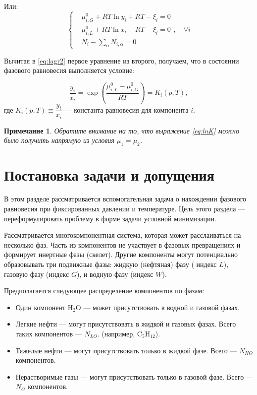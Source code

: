 \documentclass[12pt]{article}
\newtheorem{note}{Примечание}[section]
\begin{document}
Или:
\begin{equation}
\left\{
\begin{aligned}
& \mu_{i, G}^0 + RT \ln y_i + RT - \xi_i = 0\\
& \mu_{i, L}^0 + RT \ln x_i + RT - \xi_i = 0\\
& N_i - \sum_{\alpha} N_{i,\alpha} = 0
\end{aligned}
\label{eq:lagr2} \right.,\quad\forall i
\end{equation}

Вычитая в \eqref{eq:lagr2} первое уравнение из второго, получаем, что в состоянии фазового равновесия выполняется условие:

\begin{equation}
\frac{y_i}{x_i} = \exp \left(\frac{\mu_{i, L}^0 - \mu_{i, G}^0}{RT}\right) = K_i(p,T), \label{eq:lnK}
\end{equation}
где $K_i(p,T) \equiv \dfrac{y_i}{x_i}$ --- константа равновесия для компонента $i$.


\begin{note}
Обратите внимание на то, что выражение \eqref{eq:lnK} можно было получить напрямую из условия $\mu_1 = \mu_2$.
\end{note}


\section{Постановка задачи и допущения}

В этом разделе рассматривается вспомогательная задача о нахождении фазового равновесия при фиксированных давлении и температуре. Цель этого раздела --- переформулировать проблему в форме задачи условной минимизации.

Рассматривается многокомпонентная система, которая может расслаиваться на несколько фаз. Часть из компонентов не участвует в фазовых превращениях и формирует инертные фазы (скелет). Другие компоненты могут потенциально образовывать три подвижные фазы: жидкую (нефтяная) фазу ( индекс $L$), газовую фазу (индекс $G$), и водную фазу (индекс $W$).

Предполагается следующее распределение компонентов по фазам:
\begin{itemize}
\item Один компонент $\mathrm{H_2O}$ --- может присутствовать в водной и газовой фазах.
\item Легкие нефти --- могут присутствовать в жидкой и газовых фазах. Всего таких компонентов --- $N_{LO}$. (например, $\mathrm{C_5H_{12}}$).
\item Тяжелые нефти --- могут присутствовать только в жидкой фазе. Всего --- $N_{HO}$ компонентов.
\item Нерастворимые газы --- могут присутствовать только в газовой фазе. Всего --- $N_{G}$ компонентов.
\end{itemize}
\end{document}
